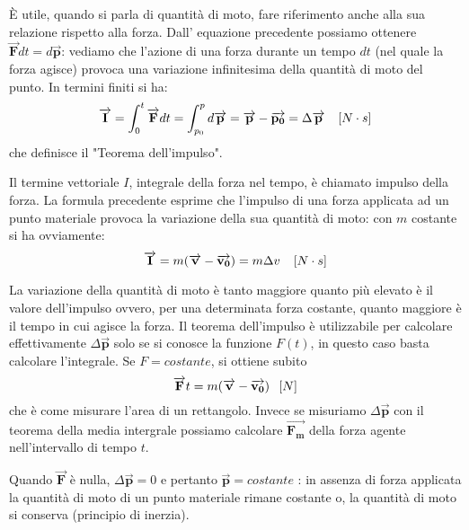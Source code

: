 \documentclass[class=book, crop=false, oneside, 12pt]{standalone}
\begin{document}
È utile, quando si parla di quantità di moto, fare riferimento anche alla sua relazione rispetto alla forza.
Dall' equazione precedente possiamo ottenere \(\overrightarrow{\mathbf{F}} d t = d \overrightarrow{\mathbf{p}}\): vediamo che l'azione di una forza durante un tempo \(d t\) (nel quale la forza agisce) provoca una variazione infinitesima della quantità di moto del punto. 
In termini finiti si ha:
\begin{equation}
    \overrightarrow{\mathbf{I}} = \int_0^t \overrightarrow{\mathbf{F}} dt = \int_{p_0}^p d \overrightarrow{\mathbf{p}} = \overrightarrow{\mathbf{p}}-\overrightarrow{\mathbf{p_0}} = \Delta \overrightarrow{\mathbf{p}} \ \udm{N \cdot s}
\end{equation} che definisce il "Teorema dell'impulso".

Il termine vettoriale \(I\), integrale della forza nel tempo, è chiamato impulso della forza. 
La formula precedente esprime che l'impulso di una forza applicata ad un punto materiale provoca la variazione della sua quantità di moto: con \(m\) costante si ha ovviamente:
\begin{equation}
    \overrightarrow{\mathbf{I}} = m (\overrightarrow{\mathbf{v}} - \overrightarrow{\mathbf{v_0}}) = m \Delta v \ \udm{N \cdot s}
\end{equation}

La variazione della quantità di moto è tanto maggiore quanto più elevato è il valore dell'impulso ovvero, per una determinata forza costante, quanto maggiore è il tempo in cui agisce la forza.
Il teorema dell'impulso è utilizzabile per calcolare effettivamente \(\Delta \overrightarrow{\mathbf{p}}\) solo se si conosce la funzione \(F (t)\), in questo caso basta calcolare l'integrale.
Se \(F = costante\), si ottiene subito
\begin{equation*}
    \overrightarrow{\mathbf{F}} t = m (\overrightarrow{\mathbf{v}} - \overrightarrow{\mathbf{v_0}}) \udm{N}
\end{equation*}
che è come misurare l'area di un rettangolo.
Invece se misuriamo \(\Delta \overrightarrow{\mathbf{p}}\) con il teorema della media intergrale possiamo calcolare \(\overrightarrow{\mathbf{F_m}}\) della forza agente nell'intervallo di tempo \(t\).

Quando \(\overrightarrow{\mathbf{F}}\) è nulla, \(\Delta \overrightarrow{\mathbf{p}} = 0\) e pertanto \(\overrightarrow{\mathbf{p}} = costante\) : in assenza di forza applicata la quantità di moto di un punto materiale rimane costante o, la quantità di moto si conserva (principio di inerzia). 
\end{document}
